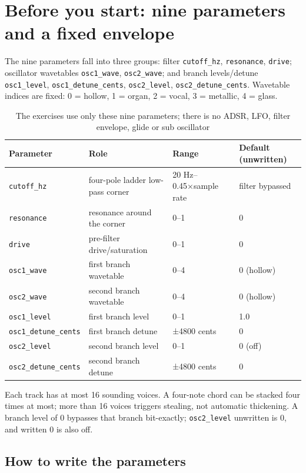 \section{Before you start: nine parameters and a fixed envelope}

The nine parameters fall into three groups: filter \texttt{cutoff\_hz}, \texttt{resonance}, \texttt{drive}; oscillator wavetables \texttt{osc1\_wave}, \texttt{osc2\_wave}; and branch levels/detune \texttt{osc1\_level}, \texttt{osc1\_detune\_cents}, \texttt{osc2\_level}, \texttt{osc2\_detune\_cents}. Wavetable indices are fixed: 0 = hollow, 1 = organ, 2 = vocal, 3 = metallic, 4 = glass.

\begin{table}[htbp]
\centering
\small
\begin{tabular}{@{}llll@{}}
\hline
Parameter & Role & Range & Default (unwritten) \\
\hline
\texttt{cutoff\_hz} & four-pole ladder low-pass corner & 20 Hz--0.45×sample rate & filter bypassed \\
\texttt{resonance} & resonance around the corner & 0--1 & 0 \\
\texttt{drive} & pre-filter drive/saturation & 0--1 & 0 \\
\texttt{osc1\_wave} & first branch wavetable & 0--4 & 0 (hollow) \\
\texttt{osc2\_wave} & second branch wavetable & 0--4 & 0 (hollow) \\
\texttt{osc1\_level} & first branch level & 0--1 & 1.0 \\
\texttt{osc1\_detune\_cents} & first branch detune & ±4800 cents & 0 \\
\texttt{osc2\_level} & second branch level & 0--1 & 0 (off) \\
\texttt{osc2\_detune\_cents} & second branch detune & ±4800 cents & 0 \\
\hline
\end{tabular}
\caption{The exercises use only these nine parameters; there is no ADSR, LFO, filter envelope, glide or sub oscillator}
\label{tab:exercise-params}
\end{table}

Each track has at most 16 sounding voices. A four-note chord can be stacked four times at most; more than 16 voices triggers stealing, not automatic thickening. A branch level of 0 bypasses that branch bit-exactly; \texttt{osc2\_level} unwritten is 0, and written 0 is also off.

\subsection{How to write the parameters}

